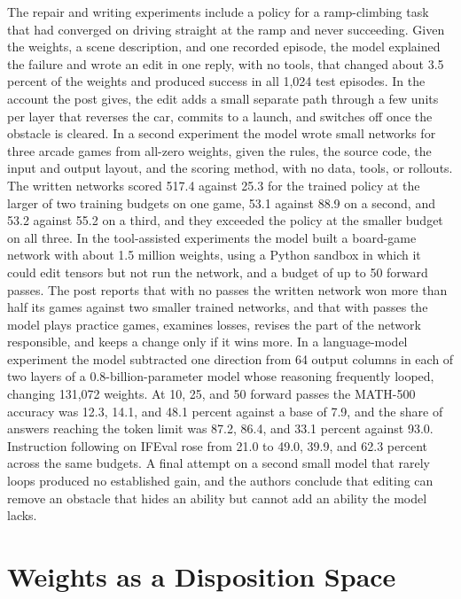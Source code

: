 \documentclass[11pt]{article}
\begin{document}
The repair and writing experiments include a policy for a ramp-climbing task that had converged on driving straight at the ramp and never succeeding. Given the weights, a scene description, and one recorded episode, the model explained the failure and wrote an edit in one reply, with no tools, that changed about 3.5 percent of the weights and produced success in all 1,024 test episodes. In the account the post gives, the edit adds a small separate path through a few units per layer that reverses the car, commits to a launch, and switches off once the obstacle is cleared. In a second experiment the model wrote small networks for three arcade games from all-zero weights, given the rules, the source code, the input and output layout, and the scoring method, with no data, tools, or rollouts. The written networks scored 517.4 against 25.3 for the trained policy at the larger of two training budgets on one game, 53.1 against 88.9 on a second, and 53.2 against 55.2 on a third, and they exceeded the policy at the smaller budget on all three. In the tool-assisted experiments the model built a board-game network with about 1.5 million weights, using a Python sandbox in which it could edit tensors but not run the network, and a budget of up to 50 forward passes. The post reports that with no passes the written network won more than half its games against two smaller trained networks, and that with passes the model plays practice games, examines losses, revises the part of the network responsible, and keeps a change only if it wins more. In a language-model experiment the model subtracted one direction from 64 output columns in each of two layers of a 0.8-billion-parameter model whose reasoning frequently looped, changing 131,072 weights. At 10, 25, and 50 forward passes the MATH-500 accuracy was 12.3, 14.1, and 48.1 percent against a base of 7.9, and the share of answers reaching the token limit was 87.2, 86.4, and 33.1 percent against 93.0. Instruction following on IFEval rose from 21.0 to 49.0, 39.9, and 62.3 percent across the same budgets. A final attempt on a second small model that rarely loops produced no established gain, and the authors conclude that editing can remove an obstacle that hides an ability but cannot add an ability the model lacks.

\section{Weights as a Disposition Space}
\end{document}
